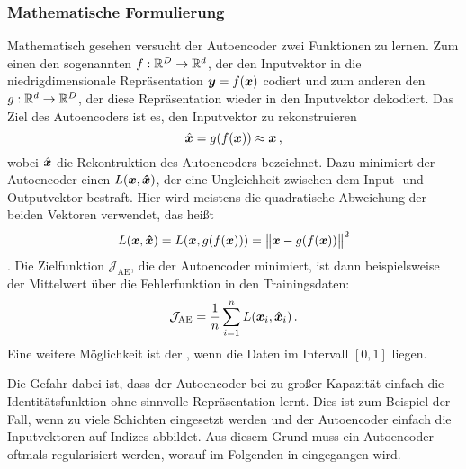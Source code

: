 \subsubsection{Mathematische Formulierung}
\label{ch:MethodenDerDimRed:ML:AE:MathematischeFormulierung}
Mathematisch gesehen versucht der Autoencoder zwei Funktionen zu lernen. Zum einen den sogenannten  $f: \mathbb{R}^D \rightarrow \mathbb{R}^d$, der den Inputvektor in die niedrigdimensionale Repräsentation $\bm{y} = f(\bm{x})$ codiert und zum anderen den  $g: \mathbb{R}^d \rightarrow \mathbb{R}^D$, der diese Repräsentation wieder in den Inputvektor dekodiert. Das Ziel des Autoencoders ist es, den Inputvektor zu rekonstruieren
\begin{equation}
	\hat{\bm{x}} = g(f(\bm{x})) \approx \bm{x} \, ,
\end{equation}
wobei $\hat{\bm{x}}$ die Rekontruktion des Autoencoders bezeichnet.
Dazu minimiert der Autoencoder einen  $L(\bm{x}, \bm{\hat{x}})$, der eine Ungleichheit zwischen dem Input- und Outputvektor bestraft. Hier wird meistens die quadratische Abweichung der beiden Vektoren verwendet, das heißt
\begin{equation}
	\label{eq:MSE_loss}
	L(\vect{x}, \vect{\estNormal{x}}) = L(\vect{x}, g(f(\vect{x}))) = \norm[\big]{\vect{x} - g(f(\vect{x}))}^2
\end{equation}
\parencite[507]{Goodfellow.2016}. Die Zielfunktion $\mathcal{J}_{\text{AE}}$, die der Autoencoder
minimiert, ist dann beispielsweise der Mittelwert über die Fehlerfunktion in den Trainingsdaten:
\begin{equation}
	\label{eq:AE_objectiveFunction}
	\mathcal{J}_{\text{AE}} = \frac{1}{n} \sum_{i = 1}^n L(\vect{x}_i, \estNormal{\vect{x}}_i) \, .
\end{equation}
Eine weitere Möglichkeit ist der , wenn die Daten im Intervall $[0, 1]$ liegen.

Die Gefahr dabei ist, dass der Autoencoder bei zu großer Kapazität einfach die Identitätsfunktion
ohne sinnvolle Repräsentation lernt. Dies ist zum Beispiel der Fall, wenn zu viele Schichten
eingesetzt werden und der Autoencoder einfach die Inputvektoren auf Indizes abbildet. Aus diesem
Grund muss ein Autoencoder oftmals regularisiert werden, worauf im Folgenden in
 eingegangen wird.

